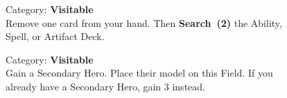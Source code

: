 \begin{figure}[H]
  \begin{minipage}[t]{0.47\textwidth}
    \vspace{0pt}
    \centering
    \caption{\small Category: \textbf{Visitable}\\
       6  to \textbf{Search (4)} the Ability Discard Pile.}
  \end{minipage}\hfill
  \begin{minipage}[t]{0.47\textwidth}
    \vspace{0pt}
    \centering
    \caption{\small Category: \textbf{Visitable}\\
      Remove one card from your hand.
      Then \textbf{Search~(2)} the Ability, Spell, or Artifact Deck.
    }
  \end{minipage}
\end{figure}

\begin{figure}[H]
  \begin{minipage}[t]{0.47\textwidth}
    \vspace{0pt}
    \centering
    \caption{\small Category: \textbf{Visitable}\\
      You may immediately reinforce one of your  or  units.
      The reinforcement cost is reduced by 3  to a minimum of 0.}
  \end{minipage}\hfill
  \begin{minipage}[t]{0.47\textwidth}
    \vspace{0pt}
    \centering
    \caption{\small Category: \textbf{Visitable}\\
      Gain a Secondary Hero.
      Place their model on this Field.
      If you already have a Secondary Hero, gain 3  instead.}
  \end{minipage}
\end{figure}

